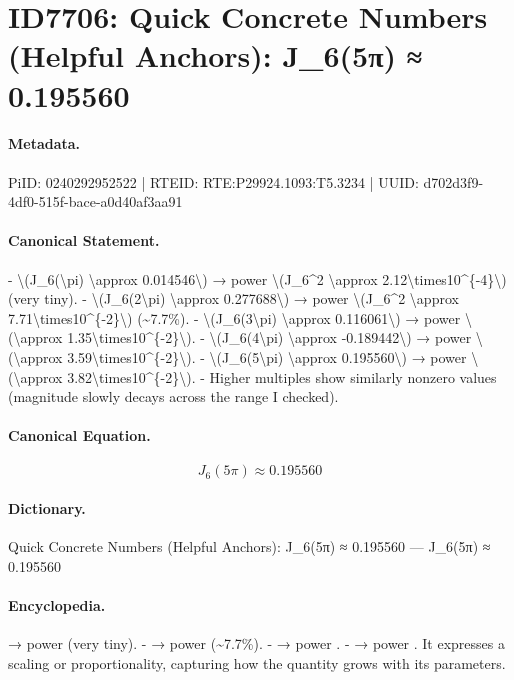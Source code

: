\section*{ID7706: Quick Concrete Numbers (Helpful Anchors): J\_6(5π) ≈ 0.195560}
\paragraph{Metadata.}
PiID: 0240292952522 | RTEID: RTE:P29924.1093:T5.3234 | UUID: d702d3f9-4df0-515f-bace-a0d40af3aa91

\paragraph{Canonical Statement.}
- \textbackslash{}(J\_6(\textbackslash{}pi) \textbackslash{}approx 0.014546\textbackslash{}) → power \textbackslash{}(J\_6\textasciicircum{}2 \textbackslash{}approx 2.12\textbackslash{}times10\textasciicircum{}\{-4\}\textbackslash{}) (very tiny). - \textbackslash{}(J\_6(2\textbackslash{}pi) \textbackslash{}approx 0.277688\textbackslash{}) → power \textbackslash{}(J\_6\textasciicircum{}2 \textbackslash{}approx 7.71\textbackslash{}times10\textasciicircum{}\{-2\}\textbackslash{}) (\textasciitilde{}7.7\%). - \textbackslash{}(J\_6(3\textbackslash{}pi) \textbackslash{}approx 0.116061\textbackslash{}) → power \textbackslash{}(\textbackslash{}approx 1.35\textbackslash{}times10\textasciicircum{}\{-2\}\textbackslash{}). - \textbackslash{}(J\_6(4\textbackslash{}pi) \textbackslash{}approx -0.189442\textbackslash{}) → power \textbackslash{}(\textbackslash{}approx 3.59\textbackslash{}times10\textasciicircum{}\{-2\}\textbackslash{}). - \textbackslash{}(J\_6(5\textbackslash{}pi) \textbackslash{}approx 0.195560\textbackslash{}) → power \textbackslash{}(\textbackslash{}approx 3.82\textbackslash{}times10\textasciicircum{}\{-2\}\textbackslash{}). - Higher multiples show similarly nonzero values (magnitude slowly decays across the range I checked).

\paragraph{Canonical Equation.}
\[
J_6(5\pi) \approx 0.195560
\]

\paragraph{Dictionary.}
Quick Concrete Numbers (Helpful Anchors): J\_6(5π) ≈ 0.195560 — J\_6(5π) ≈ 0.195560

\paragraph{Encyclopedia.}
→ power (very tiny). - → power (\textasciitilde{}7.7\%). - → power . - → power . It expresses a scaling or proportionality, capturing how the quantity grows with its parameters.
